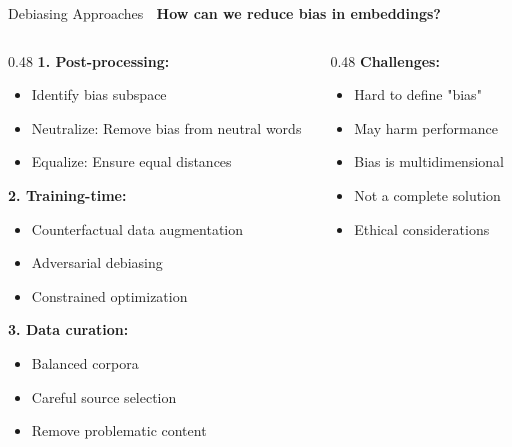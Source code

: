 \documentclass[aspectratio=169]{beamer}
\begin{document}
\begin{frame}[shrink=10]{Debiasing Approaches 🔧}
\textbf{How can we reduce bias in embeddings?}

\vspace{1em}

\begin{columns}[T]
\begin{column}{0.48\textwidth}
\textbf{1. Post-processing:}
\begin{itemize}\setlength{\itemsep}{0pt}
    \item Identify bias subspace
    \item Neutralize: Remove bias from neutral words
    \item Equalize: Ensure equal distances
\end{itemize}

\vspace{0.5em}
\textbf{2. Training-time:}
\begin{itemize}\setlength{\itemsep}{0pt}
    \item Counterfactual data augmentation
    \item Adversarial debiasing
    \item Constrained optimization
\end{itemize}

\vspace{0.5em}
\textbf{3. Data curation:}
\begin{itemize}\setlength{\itemsep}{0pt}
    \item Balanced corpora
    \item Careful source selection
    \item Remove problematic content
\end{itemize}
\end{column}

\begin{column}{0.48\textwidth}
\textbf{Challenges:}
\begin{itemize}\setlength{\itemsep}{0pt}
    \item Hard to define "bias"
    \item May harm performance
    \item Bias is multidimensional
    \item Not a complete solution
    \item Ethical considerations
\end{itemize}


\end{column}
\end{columns}
\end{frame}
\end{document}

